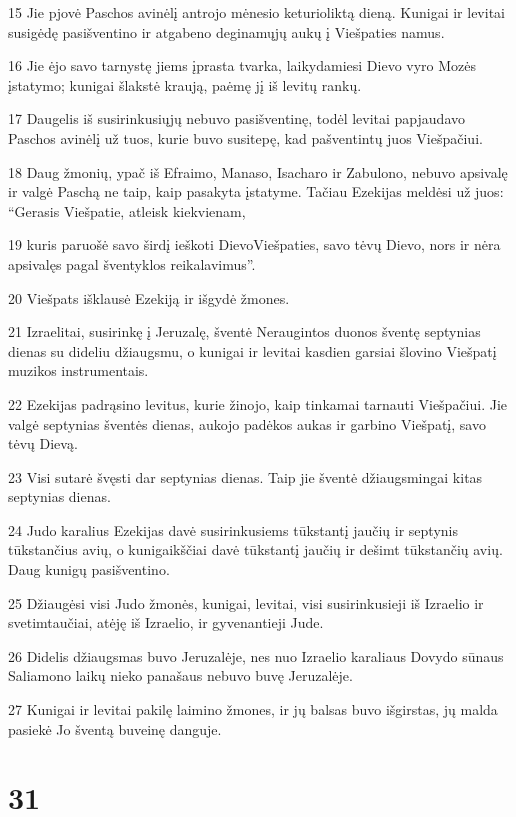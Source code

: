 \par 15 Jie pjovė Paschos avinėlį antrojo mėnesio keturioliktą dieną. Kunigai ir levitai susigėdę pasišventino ir atgabeno deginamųjų aukų į Viešpaties namus. 
\par 16 Jie ėjo savo tarnystę jiems įprasta tvarka, laikydamiesi Dievo vyro Mozės įstatymo; kunigai šlakstė kraują, paėmę jį iš levitų rankų. 
\par 17 Daugelis iš susirinkusiųjų nebuvo pasišventinę, todėl levitai papjaudavo Paschos avinėlį už tuos, kurie buvo susitepę, kad pašventintų juos Viešpačiui. 
\par 18 Daug žmonių, ypač iš Efraimo, Manaso, Isacharo ir Zabulono, nebuvo apsivalę ir valgė Paschą ne taip, kaip pasakyta įstatyme. Tačiau Ezekijas meldėsi už juos: “Gerasis Viešpatie, atleisk kiekvienam, 
\par 19 kuris paruošė savo širdį ieškoti Dievo­Viešpaties, savo tėvų Dievo, nors ir nėra apsivalęs pagal šventyklos reikalavimus”. 
\par 20 Viešpats išklausė Ezekiją ir išgydė žmones. 
\par 21 Izraelitai, susirinkę į Jeruzalę, šventė Neraugintos duonos šventę septynias dienas su dideliu džiaugsmu, o kunigai ir levitai kasdien garsiai šlovino Viešpatį muzikos instrumentais. 
\par 22 Ezekijas padrąsino levitus, kurie žinojo, kaip tinkamai tarnauti Viešpačiui. Jie valgė septynias šventės dienas, aukojo padėkos aukas ir garbino Viešpatį, savo tėvų Dievą. 
\par 23 Visi sutarė švęsti dar septynias dienas. Taip jie šventė džiaugsmingai kitas septynias dienas. 
\par 24 Judo karalius Ezekijas davė susirinkusiems tūkstantį jaučių ir septynis tūkstančius avių, o kunigaikščiai davė tūkstantį jaučių ir dešimt tūkstančių avių. Daug kunigų pasišventino. 
\par 25 Džiaugėsi visi Judo žmonės, kunigai, levitai, visi susirinkusieji iš Izraelio ir svetimtaučiai, atėję iš Izraelio, ir gyvenantieji Jude. 
\par 26 Didelis džiaugsmas buvo Jeruzalėje, nes nuo Izraelio karaliaus Dovydo sūnaus Saliamono laikų nieko panašaus nebuvo buvę Jeruzalėje. 
\par 27 Kunigai ir levitai pakilę laimino žmones, ir jų balsas buvo išgirstas, jų malda pasiekė Jo šventą buveinę danguje.



\chapter{31}


